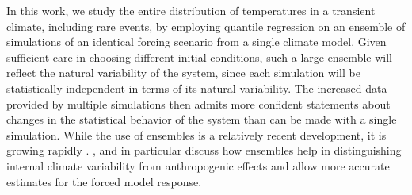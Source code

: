 \documentclass{ametsoc}
\begin{document}
In this work, we study the entire distribution of temperatures in a transient climate, including rare events, by employing quantile regression on an ensemble of simulations of an identical forcing scenario from a single climate model.
Given sufficient care in choosing different initial conditions, such a large ensemble will reflect the natural variability of the system, since each simulation will be statistically independent in terms of its natural variability. 
The increased data provided by multiple simulations %
then admits more confident statements about changes in the statistical behavior of the system %
than can be made with a single simulation. While the use of ensembles is a relatively recent development, it is growing rapidly \citep[e.g.][]{deser2012uncertainty, deser2012communication,deser2014projecting,fischer2014detection, kay2015community,sriver2015effects, rodgers2015emergence, hagos2016projection}. \citet{deser2012uncertainty}, \citet{deser2012communication} and \citet{fischer2014detection} in particular discuss how ensembles help in distinguishing internal climate variability from anthropogenic effects and allow more accurate estimates for the forced model response.
\end{document}
